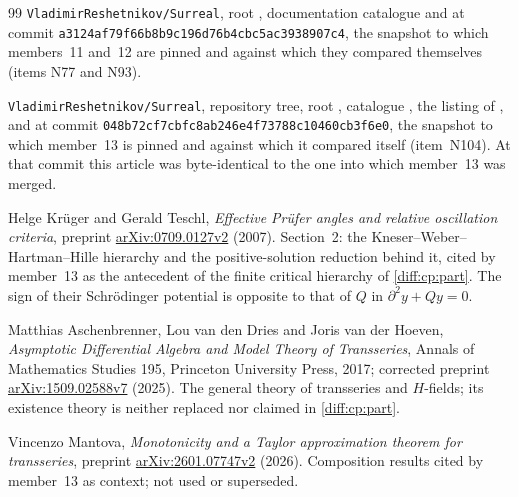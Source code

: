 \documentclass[11pt,letterpaper]{article}
\numberwithin{equation}{section}
\theoremstyle{definition}
\theoremstyle{remark}
\newcommand{\der}{\partial}
\newcommand{\Repo}{\texttt{VladimirReshetnikov/Surreal}}
\newcommand{\CommitC}{\nolinkurl{a3124af79f66b8b9c196d76b4cbc5ac3938907c4}}
\newcommand{\CommitD}{\nolinkurl{048b72cf7cbfc8ab246e4f73788c10460cb3f6e0}}
\begin{document}
\begin{thebibliography}{99}
\Repo, root , documentation catalogue  and
 at commit \CommitC, the
snapshot to which members~11 and~12 are pinned and against which they compared
themselves (items N77 and N93).

\Repo, repository tree, root , catalogue ,
the listing of , and
 at commit \CommitD, the
snapshot to which member~13 is pinned and against which it compared itself
(item~N104). At that commit this article was byte-identical to the one into
which member~13 was merged.

Helge Kr\"uger and Gerald Teschl,
\emph{Effective Pr\"ufer angles and relative oscillation criteria},
preprint \href{https://arxiv.org/abs/0709.0127}{arXiv:0709.0127v2} (2007).
Section~2: the Kneser--Weber--Hartman--Hille hierarchy and the positive-solution
reduction behind it, cited by member~13 as the antecedent of the finite critical
hierarchy of \cref{diff:cp:part}. The sign of their Schr\"odinger potential is
opposite to that of $Q$ in $\der^{2}y+Qy=0$.

Matthias Aschenbrenner, Lou van den Dries and Joris van der Hoeven,
\emph{Asymptotic Differential Algebra and Model Theory of Transseries},
Annals of Mathematics Studies 195, Princeton University Press, 2017;
corrected preprint \href{https://arxiv.org/abs/1509.02588}{arXiv:1509.02588v7}
(2025). The general theory of transseries and $H$-fields; its existence theory
is neither replaced nor claimed in \cref{diff:cp:part}.

Vincenzo Mantova,
\emph{Monotonicity and a Taylor approximation theorem for transseries},
preprint \href{https://arxiv.org/abs/2601.07747}{arXiv:2601.07747v2} (2026).
Composition results cited by member~13 as context; not used or superseded.

\end{thebibliography}
\end{document}
